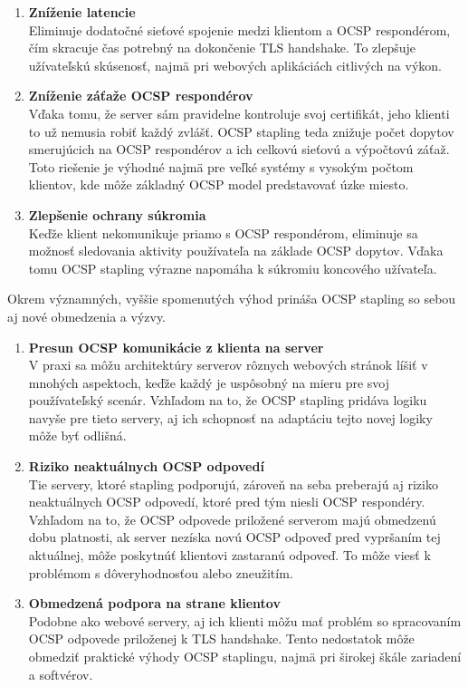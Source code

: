 \documentclass[12pt, twoside]{book}
\begin{document}
\begin{enumerate}
\item \textbf{Zníženie latencie} \\
Eliminuje dodatočné sieťové spojenie medzi klientom a OCSP respondérom, čím skracuje čas potrebný na dokončenie TLS handshake. To zlepšuje užívateľskú skúsenosť, najmä pri webových aplikáciách citlivých na výkon.

\item \textbf{Zníženie záťaže OCSP respondérov} \\
Vďaka tomu, že server sám pravidelne kontroluje svoj certifikát, jeho klienti to už nemusia robiť každý zvlášť. OCSP stapling teda znižuje počet dopytov smerujúcich na OCSP respondérov a ich celkovú sieťovú a výpočtovú záťaž. Toto riešenie je výhodné najmä pre veľké systémy s vysokým počtom klientov, kde môže základný OCSP model predstavovať úzke miesto.

\item \textbf{Zlepšenie ochrany súkromia} \\
Keďže klient nekomunikuje priamo s OCSP respondérom, eliminuje sa možnosť sledovania aktivity používateľa na základe OCSP dopytov. Vďaka tomu OCSP stapling výrazne  napomáha k súkromiu koncového užívateľa.

\end{enumerate}

Okrem významných, vyššie spomenutých výhod prináša OCSP stapling so sebou aj nové 
obmedzenia a výzvy.

\begin{enumerate}
\item \textbf{Presun OCSP komunikácie z klienta na server} \\
V praxi sa môžu architektúry serverov rôznych webových stránok líšiť v mnohých aspektoch, keďže každý je uspôsobný na mieru pre svoj používateľský scenár. 
Vzhľadom na to, že OCSP stapling pridáva logiku navyše pre tieto servery, aj ich 
schopnosť na adaptáciu tejto novej logiky môže byť odlišná.

\item \textbf{Riziko neaktuálnych OCSP odpovedí} \\
Tie servery, ktoré stapling podporujú, zároveň na seba preberajú aj riziko neaktuálnych OCSP odpovedí, ktoré pred tým niesli  OCSP respondéry.
Vzhľadom na to, že OCSP odpovede priložené serverom majú obmedzenú dobu platnosti, ak server nezíska novú OCSP odpoveď pred vypršaním tej aktuálnej, môže poskytnúť klientovi zastaranú odpoveď. To môže viesť k problémom s dôveryhodnosťou alebo zneužitím.

\item \textbf{Obmedzená podpora na strane klientov} \\
Podobne ako webové servery, aj ich klienti môžu mať problém so spracovaním OCSP odpovede priloženej k TLS handshake. Tento nedostatok môže obmedziť praktické výhody OCSP staplingu, najmä pri širokej škále zariadení a softvérov.

\end{enumerate}
\end{document}
